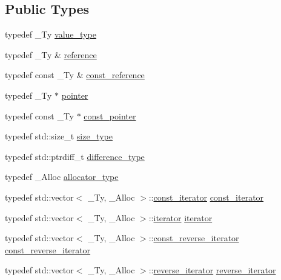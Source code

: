 \subsection*{Public Types}
\begin{DoxyCompactItemize}
\item 
typedef \+\_\+\+Ty \hyperlink{classcrsc_1_1dynamic__matrix_a27b83d28002e3e2bb316f1f0460e9cca}{value\+\_\+type}
\item 
typedef \+\_\+\+Ty \& \hyperlink{classcrsc_1_1dynamic__matrix_ad5dc61e01a1c64395f328ef851a5ffcf}{reference}
\item 
typedef const \+\_\+\+Ty \& \hyperlink{classcrsc_1_1dynamic__matrix_a93dd3386c16d60c4e8fb1e10b442fae0}{const\+\_\+reference}
\item 
typedef \+\_\+\+Ty $\ast$ \hyperlink{classcrsc_1_1dynamic__matrix_a9ed63c32093334327c1f7a4822d6feb6}{pointer}
\item 
typedef const \+\_\+\+Ty $\ast$ \hyperlink{classcrsc_1_1dynamic__matrix_ab72da9ca0ac66408077687988c31a781}{const\+\_\+pointer}
\item 
typedef std\+::size\+\_\+t \hyperlink{classcrsc_1_1dynamic__matrix_a52b776dc7f60d8798c884d7d3c361a8a}{size\+\_\+type}
\item 
typedef std\+::ptrdiff\+\_\+t \hyperlink{classcrsc_1_1dynamic__matrix_a46c3124226d9b209aae58572e4462707}{difference\+\_\+type}
\item 
typedef \+\_\+\+Alloc \hyperlink{classcrsc_1_1dynamic__matrix_a730075d7fe9fd20dc909642546854572}{allocator\+\_\+type}
\item 
typedef std\+::vector$<$ \+\_\+\+Ty, \+\_\+\+Alloc $>$\+::\hyperlink{classcrsc_1_1dynamic__matrix_a85960561507869e760b0b0f4be6964cf}{const\+\_\+iterator} \hyperlink{classcrsc_1_1dynamic__matrix_a85960561507869e760b0b0f4be6964cf}{const\+\_\+iterator}
\item 
typedef std\+::vector$<$ \+\_\+\+Ty, \+\_\+\+Alloc $>$\+::\hyperlink{classcrsc_1_1dynamic__matrix_a2fe15f8dee8317af955c053888308927}{iterator} \hyperlink{classcrsc_1_1dynamic__matrix_a2fe15f8dee8317af955c053888308927}{iterator}
\item 
typedef std\+::vector$<$ \+\_\+\+Ty, \+\_\+\+Alloc $>$\+::\hyperlink{classcrsc_1_1dynamic__matrix_abb589a5b7c7d7869e00f82ac7370cf93}{const\+\_\+reverse\+\_\+iterator} \hyperlink{classcrsc_1_1dynamic__matrix_abb589a5b7c7d7869e00f82ac7370cf93}{const\+\_\+reverse\+\_\+iterator}
\item 
typedef std\+::vector$<$ \+\_\+\+Ty, \+\_\+\+Alloc $>$\+::\hyperlink{classcrsc_1_1dynamic__matrix_af87d57ef714d48cde9ae83bfda908243}{reverse\+\_\+iterator} \hyperlink{classcrsc_1_1dynamic__matrix_af87d57ef714d48cde9ae83bfda908243}{reverse\+\_\+iterator}
\end{DoxyCompactItemize}
